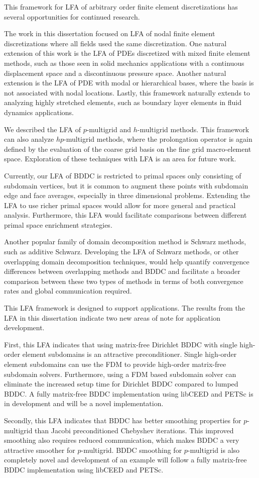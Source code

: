 This framework for LFA of arbitrary order finite element discretizations has several opportunities for continued research.

The work in this dissertation focused on LFA of nodal finite element discretizations where all fields used the same discretization.
One natural extension of this work is the LFA of PDEs discretized with mixed finite element methods, such as those seen in solid mechanics applications with a continuous displacement space and a discontinuous pressure space.
Another natural extension is the LFA of PDE with modal or hierarchical bases, where the basis is not associated with nodal locations.
Lastly, this framework naturally extends to analyzing highly stretched elements, such as boundary layer elements in fluid dynamics applications.

We described the LFA of $p$-multigrid and $h$-multigrid methods.
This framework can also analyze $hp$-multigrid methods, where the prolongation operator is again defined by the evaluation of the coarse grid basis on the fine grid macro-element space.
Exploration of these techniques with LFA is an area for future work.

Currently, our LFA of BDDC is restricted to primal spaces only consisting of subdomain vertices, but it is common to augment these points with subdomain edge and face averages, especially in three dimensional problems.
Extending the LFA to use richer primal spaces would allow for more general and practical analysis.
Furthermore, this LFA would facilitate comparisons between different primal space enrichment strategies.

Another popular family of domain decomposition method is Schwarz methods, such as additive Schwarz.
Developing the LFA of Schwarz methods, or other overlapping domain decomposition techniques, would help quantify convergence differences between overlapping methods and BDDC and facilitate a broader comparison between these two types of methods in terms of both convergence rates and global communication required.

This LFA framework is designed to support applications.
The results from the LFA in this dissertation indicate two new areas of note for application development.

First, this LFA indicates that using matrix-free Dirichlet BDDC with single high-order element subdomains is an attractive preconditioner.
Single high-order element subdomains can use the FDM to provide high-order matrix-free subdomain solvers.
Furthermore, using a FDM based subdomain solver can eliminate the increased setup time for Dirichlet BDDC compared to lumped BDDC.
A fully matrix-free BDDC implementation using libCEED and PETSc is in development and will be a novel implementation.

Secondly, this LFA indicates that BDDC has better smoothing properties for $p$-multigrid than Jacobi preconditioned Chebyshev iterations.
This improved smoothing also requires reduced communication, which makes BDDC a very attractive smoother for $p$-multigrid.
BDDC smoothing for $p$-multigrid is also completely novel and development of an example will follow a fully matrix-free BDDC implementation using libCEED and PETSc.